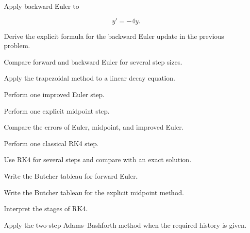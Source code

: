 \begin{exercise}[2]
Apply backward Euler to

\[
y'=-4y.
\]
\end{exercise}

\begin{exercise}[3]
Derive the explicit formula for the backward Euler update in the previous
problem.
\end{exercise}

\begin{exercise}[3]
Compare forward and backward Euler for several step sizes.
\end{exercise}

\begin{exercise}[3]
Apply the trapezoidal method to a linear decay equation.
\end{exercise}

\begin{exercise}[2]
Perform one improved Euler step.
\end{exercise}

\begin{exercise}[2]
Perform one explicit midpoint step.
\end{exercise}

\begin{exercise}[3]
Compare the errors of Euler, midpoint, and improved Euler.
\end{exercise}

\begin{exercise}[2]
Perform one classical RK4 step.
\end{exercise}

\begin{exercise}[3]
Use RK4 for several steps and compare with an exact solution.
\end{exercise}

\begin{exercise}[3]
Write the Butcher tableau for forward Euler.
\end{exercise}

\begin{exercise}[3]
Write the Butcher tableau for the explicit midpoint method.
\end{exercise}

\begin{exercise}[3]
Interpret the stages of RK4.
\end{exercise}

\begin{exercise}[2]
Apply the two-step Adams--Bashforth method when the required history is
given.
\end{exercise}

